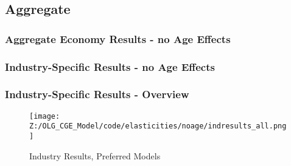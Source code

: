 \documentclass[11pt]{beamer} \usetheme{Frankfurt}
\begin{document}
\subsection{Aggregate}


\begin{frame}
  \frametitle{Aggregate Economy Results - no Age Effects}
  \centering {}
\end{frame}

    

    
\begin{frame}
  \frametitle{Industry-Specific Results - no Age Effects}
  \centering {}
\end{frame}


%     


\begin{frame}
  \frametitle{Industry-Specific Results - Overview}
  \begin{figure}[ht]
    \centering
    \texttt{[image: Z:/OLG\_CGE\_Model/code/elasticities/noage/indresults\_all.png]}
    \caption{Industry Results, Preferred Models}
    \label{fig3}
  \end{figure}
\end{frame}
\end{document}
